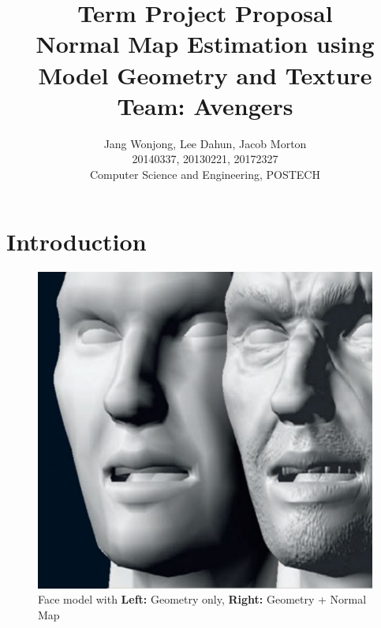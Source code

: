 \documentclass[10pt,twocolumn,letterpaper]{article}
\begin{document}
	
\title{Term Project Proposal \\
Normal Map Estimation using Model Geometry and Texture \\
Team: Avengers }
\author{Jang Wonjong, Lee Dahun, Jacob Morton\\
	20140337, 20130221, 20172327\\
	Computer Science and Engineering, POSTECH\\
	{\tt\small}}

\maketitle

\section{Introduction}
\begin{figure}[t]
	\begin{center}
		\includegraphics [scale=0.35] {image/face_normalmapping.jpg}
	\end{center}
	\caption{Face model with \textbf{Left:} Geometry only, \textbf{Right:} Geometry + Normal Map}
	\label{fig:title}
\end{figure} 
\end{document}
